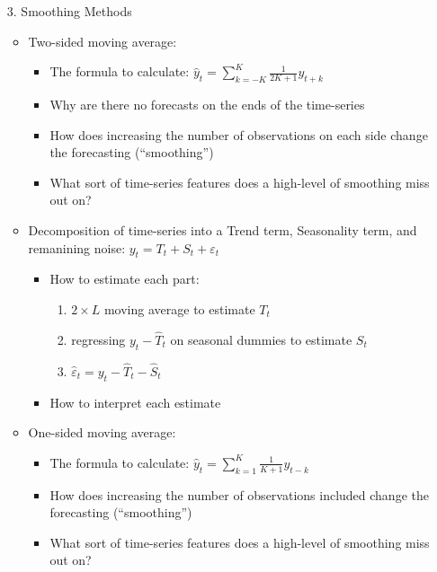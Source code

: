 \documentclass[12pt]{article}
\begin{document}
\begin{enumerate}
  \item[3.] Smoothing Methods
  
  \begin{itemize}
    \item Two-sided moving average: 
    \begin{itemize}
      \item The formula to calculate: $\hat{y}_t = \sum_{k = -K}^K \frac{1}{2K+1} y_{t + k}$

      \item Why are there no forecasts on the ends of the time-series
      
      \item How does increasing the number of observations on each side change the forecasting (``smoothing'')
      
      \item What sort of time-series features does a high-level of smoothing miss out on?
    \end{itemize}

    \item Decomposition of time-series into a Trend term, Seasonality term, and remanining noise: $y_t = T_t + S_t + \varepsilon_t$
    \begin{itemize}
      \item How to estimate each part: 
      \begin{enumerate}
        \item $2 \times L$ moving average to estimate $T_t$
        \item regressing $y_t - \hat{T}_t$ on seasonal dummies to estimate $S_t$
        \item $\hat{\varepsilon}_t = y_t - \hat{T}_t - \hat{S}_t$
      \end{enumerate}

      \item How to interpret each estimate 
    \end{itemize}

    \item One-sided moving average:
    \begin{itemize}
      \item The formula to calculate: $\hat{y}_t = \sum_{k = 1}^K \frac{1}{K+1} y_{t - k}$

      \item How does increasing the number of observations included change the forecasting (``smoothing'')

      \item What sort of time-series features does a high-level of smoothing miss out on?
    \end{itemize}


\end{itemize}
\end{enumerate}
\end{document}
